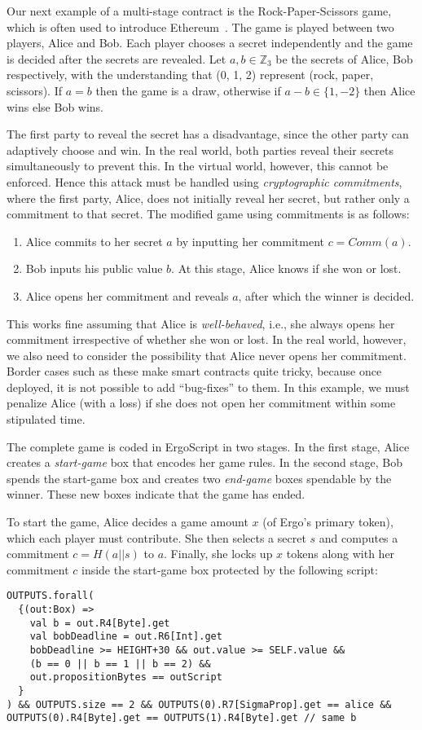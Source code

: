 \documentclass[runningheads]{llncs}
\newcommand{\langname}{ErgoScript\xspace}
\begin{document}
Our next example of a multi-stage contract is the Rock-Paper-Scissors game, which is often used to introduce Ethereum~\cite{rps15}.
The game is played between two players, Alice and Bob. Each player chooses a secret independently and the game is decided after the secrets are revealed. 
Let $a, b\in \mathbb{Z}_3$ be the secrets of Alice, Bob respectively, with the understanding that (0, 1, 2) represent (rock, paper, scissors). If $a = b$ then the game is a draw, otherwise if $a-b \in \{1, -2\}$ then Alice wins else Bob wins. 

The first party to reveal the secret has a disadvantage, since the other party can adaptively choose and win. In the real world, both parties reveal their secrets simultaneously to prevent this. In the virtual world, however, this cannot be enforced. Hence this attack must be handled using {\em cryptographic commitments}, where the first party, Alice, does not initially reveal her secret, but rather only a commitment to that secret. 
The modified game using commitments is as follows:

\begin{enumerate}
	\item Alice commits to her secret $a$ by inputting her commitment $c = Comm(a)$.
	\item Bob inputs his public value $b$. At this stage, Alice knows if she won or lost.
	\item Alice opens her commitment and reveals $a$, after which the winner is decided.
\end{enumerate}

This works fine assuming that Alice is {\em well-behaved}, i.e., she always opens her commitment irrespective of whether she won or lost. In the real world, however, we also need to consider the possibility that Alice never opens her commitment. 
Border cases such as these make smart contracts quite tricky, because once deployed, it is not possible to add ``bug-fixes'' to them. In this example, we must penalize Alice (with a loss) if she does not open her commitment within some stipulated time.

The complete game is coded in \langname in two stages. In the first stage, Alice creates a {\em start-game} box that encodes her game rules. In the second stage, Bob spends the start-game box and creates two {\em end-game} boxes spendable by the winner. These new boxes indicate that the game has ended.

To start the game, Alice decides a game amount $x$ (of Ergo's primary token), which each player must contribute. She then selects a secret $s$ and computes a commitment $c=H(a||s)$ to $a$. Finally, she locks up $x$ tokens along with her commitment $c$ inside the start-game box protected by the following script:
\small{
	\begin{verbatim}
OUTPUTS.forall(
  {(out:Box) =>
    val b = out.R4[Byte].get
    val bobDeadline = out.R6[Int].get
    bobDeadline >= HEIGHT+30 && out.value >= SELF.value &&
    (b == 0 || b == 1 || b == 2) && 
    out.propositionBytes == outScript
  }
) && OUTPUTS.size == 2 && OUTPUTS(0).R7[SigmaProp].get == alice &&
OUTPUTS(0).R4[Byte].get == OUTPUTS(1).R4[Byte].get // same b
	\end{verbatim}
}
\end{document}
